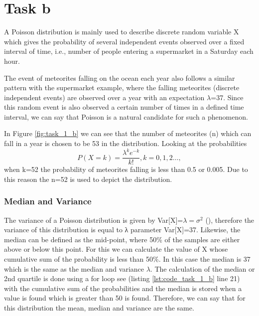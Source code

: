 \section{Task b}

A Poisson distribution is mainly used to describe discrete random variable X which gives the probability of several independent events observed over a fixed interval of time, i.e., number of people entering a supermarket in a Saturday each hour. \newline

The event of meteorites falling on the ocean each year also follows a similar pattern with the supermarket example, where the falling meteorites (discrete independent events) are observed over a year with an expectation ${\lambda}$=37. Since this random event is also observed a certain number of times in a defined time interval, we can say that Poisson is a natural candidate for such a phenomenon.\newline

In Figure \ref{fig:task_1_b} we can see that the number of meteorites (n) which can fall in a year is chosen to be 53 in the distribution. Looking at the probabilities  \begin{equation} P(X=k)=\frac{\lambda^k e^{-k}}{k!}, k=0,1,2…,  \label{pmf_poission}\end{equation} when k=52 the probability of meteorites falling is less than 0.5 or 0.005. Due to this reason the n=52 is used to depict the distribution. 

\subsubsection{Median and Variance}
The variance of a Poisson distribution is given by Var[X]=$\lambda=\sigma^2$ (\cite{hogg:2005}), therefore the variance of this distribution is equal to λ parameter Var[X]=37.
Likewise, the median can be defined as the mid-point, where 50\% of the samples are either above or below this point. For this we can calculate the value of X whose cumulative sum of the probability is less than 50\%. In this case the median is 37 which is the same as the median and variance $\lambda$. The calculation of the median or 2nd quartile is done using a for loop see (listing \ref{lst:code_task_1_b} line 21)  with the cumulative sum of the probabilities and the median is stored when a value is found which is greater than 50 is found. Therefore, we can say that for this distribution the mean, median and variance are the same.

